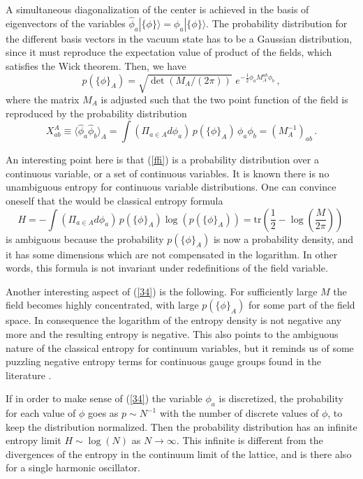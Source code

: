 \documentclass[12pt,a4paper]{article}
\newcommand{\be}{\begin{equation}}
\newcommand{\ee}{\end{equation}}
\def\be{\begin{equation}}
\def\ee{\end{equation}}
\begin{document}
A simultaneous diagonalization of the center is achieved in the basis of eigenvectors of the 
variables $\hat{\phi}_a|\{\phi\}\rangle=\phi_a |\{\phi\}\rangle$. The probability distribution for the different 
basis vectors in the vacuum state has to be a Gaussian distribution, since it must reproduce the expectation value of product 
of the fields, which satisfies the Wick theorem. Then, we have 
\begin{equation}
p(\{\phi\}_A)=\sqrt{\det(M_A/(2\pi))} \,\,e^{- \frac{1}{2}\phi_a M_A^{a b}\phi_b}\,,\label{ffi}
\end{equation}
where the matrix $M_A$ is adjusted such that the two point function of the field is reproduced by the probability distribution
\be
X^A_{ab}\equiv\langle \hat{\phi}_a \hat{\phi}_b\rangle_A=\int (\Pi_{a\in A} d\phi_a) \, p(\{\phi\}_A)\, \phi_a \phi_b=(M_A^{-1})_{a b}\,.\label{ffi1}
\ee
 


An interesting point here is that (\ref{ffi}) is a probability distribution over a continuous variable, or a set of continuous variables.
It is known there is no unambiguous entropy for continuous variable distributions. One can convince oneself that the would be classical entropy formula 
\be
H=-\int (\Pi_{a\in A} d\phi_a) \, p(\{\phi\}_A) \log(p(\{\phi\}_A))=  \textrm{tr} \left(\frac{1}{2}-\log\left(\frac{M}{2 \pi}\right)\right)\,\label{34}
\ee
is ambiguous because the probability $p(\{\phi\}_A)$ is now a probability density, and it has some dimensions which are not 
compensated in the logarithm. In other words, this formula is not invariant under redefinitions of the field variable. 


Another interesting aspect of (\ref{34}) is the following. For sufficiently large $M$ the field becomes highly concentrated, 
with large $p(\{\phi\}_A)$ for some part of the field space. In consequence the logarithm of the entropy density is not negative 
any more and the resulting entropy is negative. This also points to the ambiguous nature of the classical entropy for continuum 
variables, but it reminds us of some puzzling negative entropy terms for continuous gauge groups found in the literature \cite{Kabat}.

If in order to make sense of (\ref{34}) the variable $\phi_a$ is discretized, the probability for each value of $\phi$ goes 
as $p\sim N^{-1}$ with the number of discrete values of $\phi$, to keep the distribution normalized. Then the probability 
distribution has an infinite entropy limit $H\sim \log(N)$ as $N\rightarrow \infty$. This infinite is different from the 
divergences of the entropy in the continuum limit of the lattice, and is there also for a single harmonic oscillator. 
\end{document}
